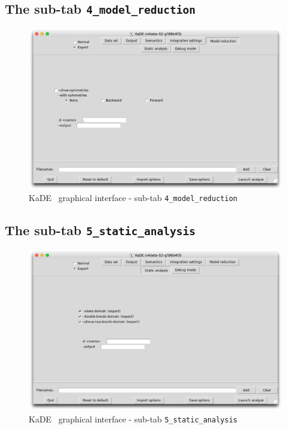 \documentclass[11pt]{book}
\def\KaDE{\textsf{KaDE}}
\begin{document}
\subsection{The sub-tab \texttt{4\_model\_reduction}}

\begin{figure}[htbp]
\centering
\includegraphics[width=12cm,bb=0 0 1904 1208]{img/kade_4.png}
\caption{\KaDE~ graphical interface - sub-tab \texttt{4\_model\_reduction}}
\label{fig:kade:4}
\end{figure}

\subsection{The sub-tab \texttt{5\_static\_analysis}}

\begin{figure}[htbp]
\centering
\includegraphics[width=12cm,bb=0 0 1904 1208]{img/kade_5.png}
\caption{\KaDE~ graphical interface - sub-tab \texttt{5\_static\_analysis}}
\label{fig:kade:5}
\end{figure}
\end{document}
